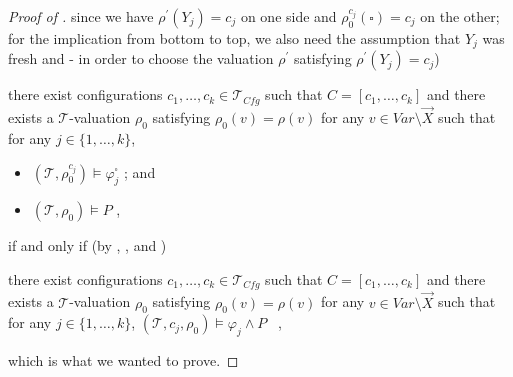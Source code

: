\begin{proof}[Proof of ]
    since we have $\rho^\prime(Y_j) = c_j$
    on one side and $\rho_0^{c_j}(\square) = c_j$ on the other; for the implication from bottom to top,
    we also need the assumption that $Y_j$ was fresh and  -
    in order to choose the valuation $\rho^\prime$ satisfying $\rho^\prime(Y_j) = c_j$)
    \begin{proofenv}
        there exist configurations $c_1, \ldots, c_k \in \mathcal{T}_{\mathit{Cfg}}$ such that
        $C = [c_1, \ldots, c_k]$ and there exists a $\mathcal{T}$-valuation $\rho_0$
        satisfying $\rho_0(v) = \rho(v)$ for any $v \in \mathit{Var} \setminus \vec{X}$
        such that for any $j \in \{ 1, \ldots, k \}$,
        \begin{itemize}
            \item $(\mathcal{T}, \rho_0^{c_j}) \vDash \varphi_j^{\square}$ ; and
            \item $(\mathcal{T}, \rho_0) \vDash P$ ,
        \end{itemize}
    \end{proofenv}
    if and only if (by , , and )
    \begin{proofenv}
        there exist configurations $c_1, \ldots, c_k \in \mathcal{T}_{\mathit{Cfg}}$ such that
        $C = [c_1, \ldots, c_k]$ and there exists a $\mathcal{T}$-valuation $\rho_0$
        satisfying $\rho_0(v) = \rho(v)$ for any $v \in \mathit{Var} \setminus \vec{X}$
        such that for any $j \in \{ 1, \ldots, k \}$,
        $(\mathcal{T}, c_j, \rho_0) \vDash \varphi_j \land P$ \, ,
    \end{proofenv}
    which is what we wanted to prove.
\end{proof}

